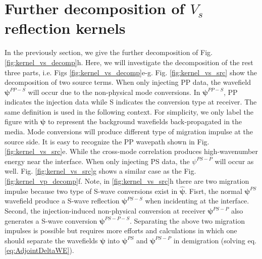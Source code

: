 \documentclass[extra,mreferee]{gji}
\newcommand{\bsy}[1]{\boldsymbol{{}#1}}
\begin{document}
\section{Further decomposition of $V_s$ reflection kernels}
In the previously section, we give the further decomposition of Fig. \ref{fig:kernel_vs_decomp}h. Here, we will
investigate the decomposition of the rest three parts, i.e. Figs
\ref{fig:kernel_vs_decomp}e-g.
Fig. \ref{fig:kernel_vs_src} show the decomposition of two source terms. 
When only injecting PP data, the wavefield $\bsy{\psi}^{PP-S}$ 
will occur due to the non-physical mode conversions.
In $\bsy{\psi}^{PP-S}$, PP indicates the injection data while S indicates the conversion type at receiver.
The same definition is used in the following context.
For simplicity, we only label the figure with $\bsy{\psi}$ to represent the background wavefields 
back-propagated in the media.
Mode conversions will produce different type
of migration impulse at the source side. 
It is easy to recognize the PP wavepath shown in Fig. \ref{fig:kernel_vs_src}e. 
While the cross-mode correlation produces high-wavenumber energy near the interface. 
When only injecting PS data, the $\psi^{PS-P}$ will occur as well.
Fig. \ref{fig:kernel_vs_src}g shows a similar case as the Fig. \ref{fig:kernel_vp_decomp}f.
Note, in \ref{fig:kernel_vs_src}h there are 
two migration impulse because two type of S-wave conversions exist in $\boldsymbol{\hat\psi}$. Fisrt,
the normal $\boldsymbol{\psi}^{PS}$ wavefield produce a S-wave reflection $\boldsymbol{\psi}^{PS-S}$
when incidenting at the interface. Second, the injection-induced non-physical conversion at receiver
$\boldsymbol{\psi}^{PS-P}$ also generates a S-wave conversion $\boldsymbol{\psi}^{PS-P-S}$. 
Separating the above two migration impulses is possible but requires more efforts and calculations in which one
should separate the wavefields $\boldsymbol{\psi}$ into $\boldsymbol{\psi}^{PS}$ and $\boldsymbol{\psi}^{PS-P}$ in
demigration (solving eq.\eqref{eq:AdjointDeltaWE}). 
\end{document}
